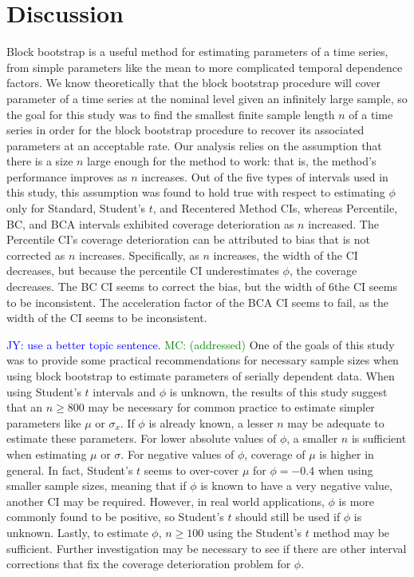 \documentclass[12pt, letterpaper, titlepage]{article}
\newcommand{\jy}[1]{\textcolor{blue}{JY: #1}}
\newcommand{\mc}[1]{\textcolor{green}{MC: (#1)}}
\begin{document}
\section{Discussion}
\label{sec:disc}

Block bootstrap is a useful method for estimating parameters of a time series,
from simple parameters like the mean to more complicated temporal dependence
factors. We know theoretically that the block bootstrap procedure will cover
parameter of a time series at the nominal level given an infinitely large
sample, so the goal for this study was to find the smallest finite sample
length $n$ of a time series in order for the block bootstrap procedure to 
recover its associated parameters at an acceptable rate.
Our analysis relies on the assumption that there is a size $n$ large
enough for the method to work: that is, the method's performance improves as
$n$ increases. Out of the five types of intervals used in this study, this
assumption was found to hold true with respect to estimating $\phi$ only for
Standard, Student's $t$, and Recentered Method CIs, whereas Percentile, BC,
and BCA intervals exhibited coverage deterioration as $n$ increased. The
Percentile CI's coverage deterioration can be attributed to bias that is not
corrected as $n$ increases. Specifically, as $n$ increases, the width of the
CI decreases, but because the percentile CI underestimates $\phi$, the
coverage decreases. The BC CI seems to correct the bias, but the width of
6the CI seems to be inconsistent. The acceleration factor of the BCA CI
seems to fail, as the width of the CI seems to be inconsistent. 


\jy{use a better topic sentence.} \mc{addressed}
One of the goals of this study was to provide some practical recommendations for 
necessary sample sizes when using block bootstrap to estimate parameters of 
serially dependent data. When using Student's $t$ intervals and $\phi$ is unknown,
the results of this study suggest that an $n \geq 800$ may be necessary for common practice to
estimate simpler parameters like $\mu$ or $\sigma_x$. If $\phi$ is already
known, a lesser $n$ may be adequate to estimate these parameters. For lower
absolute values of $\phi$, a smaller $n$ is sufficient when estimating $\mu$
or $\sigma$. For negative values of $\phi$, coverage of $\mu$ is higher in
general. In fact, Student's $t$ seems to over-cover $\mu$ for $\phi = - 0.4$
when using smaller sample sizes, meaning that if $\phi$ is known to have a
very negative value, another CI may be required. However, in real world
applications, $\phi$ is more commonly found to be positive, so Student's $t$
should still be used if $\phi$ is unknown. Lastly, to estimate $\phi$,
$n \geq 100$ using the Student's $t$ method may be sufficient. Further
investigation may be necessary to see if there are other interval corrections
that fix the coverage deterioration problem for $\phi$.
\end{document}
